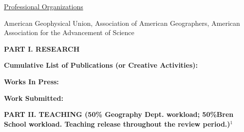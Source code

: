 \documentclass[10pt]{article}
\begin{document}
\vspace{0.5cm}
\underline{Professional Organizations}

American Geophysical Union, Association of American Geographers, American Association for the Advancement of Science

\vspace{0.5cm}

\textbf{PART I.  RESEARCH}

\vspace{0.2cm}
{\bf Cumulative List of Publications (or Creative Activities):}

\vspace{0.2cm}
{\setlength{\extrarowheight}{3.5pt}
}

\vspace{0.2cm}
{\bf Works In Press:}

\vspace{0.15cm}
{\setlength{\extrarowheight}{3.5pt}

}


\vspace{0.2cm}
{\bf Work Submitted:}

\vspace{0.15cm}
{\setlength{\extrarowheight}{3.5pt}

}


% 


%
%

\vspace{1cm}
\textbf{PART II.  TEACHING (50\% Geography Dept. workload; 50\%Bren School workload. Teaching release throughout the review period.)$^1$}
\end{document}
